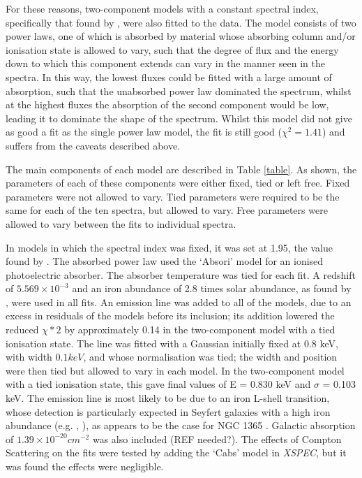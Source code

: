 \documentclass[letters,useAMS,usenatbib]{samnote}
\begin{document}
For these reasons, two-component models with a constant spectral index, specifically that found by \citet{risaliti13}, were also fitted to the data. The model consists
of two power laws, one of which is absorbed by material whose absorbing column and/or ionisation state is allowed  to vary, such that the degree of flux and the energy
down to which this component extends can vary in the manner seen in the spectra. In this way, the lowest fluxes could be fitted with a large amount of absorption, such
that the unabsorbed power law dominated the spectrum, whilst at the highest fluxes the absorption of the second component would be low, leading it to dominate the shape
of the spectrum. Whilst this model did not give as good a fit as the single power law model, the fit is still good ($\chi^2 = 1.41$) and suffers from the caveats
described above. 

The main components of each model are described in Table \ref{table}. As shown, the parameters of each of these components were either fixed, tied or left free. 
Fixed parameters were not allowed to vary. Tied parameters were required to be the same for each of the ten spectra, but allowed to vary. Free parameters were
allowed to vary between the fits to individual spectra. 

In models in which the spectral index was fixed, it was set at 1.95, the value found by \citet{risaliti13}. The absorbed power law used the `Absori' model for an ionised
photoelectric absorber. The absorber temperature was tied for each fit. A redshift of $5.569 \times 10^{-3}$ \citep{lavaux} and an iron abundance of 2.8 times solar
abundance, as found by \citet{risaliti09}, were used in all fits. An emission line was added to all of the models, due to an excess in residuals of the models
before its inclusion; its addition lowered the reduced $\chi*2$ by approximately 0.14 in the two-component model with a tied ionisation state. The line was fitted with
a Gaussian initially fixed at 0.8 keV, with width $0.1 keV$, and whose normalisation was tied; the width and position were then tied but allowed to vary in each model.
In the two-component model with a tied ionisation state, this gave final values of E = 0.830 keV and $\sigma$ = 0.103 keV. The emission line is most likely to be due to
an iron L-shell transition, whose detection is particularly expected in Seyfert galaxies with a high iron abundance (e.g. \citet{markowitz}, \citet{fabian09}), as appears
to be the case for NGC 1365 \citep{risaliti09}. Galactic absorption of $1.39 \times 10^{-20} cm^{-2}$ was also included (REF needed?). The effects of Compton Scattering
on the fits were
tested by adding the `Cabs' model in {\it XSPEC}, but it was found the effects were negligible.
\end{document}
